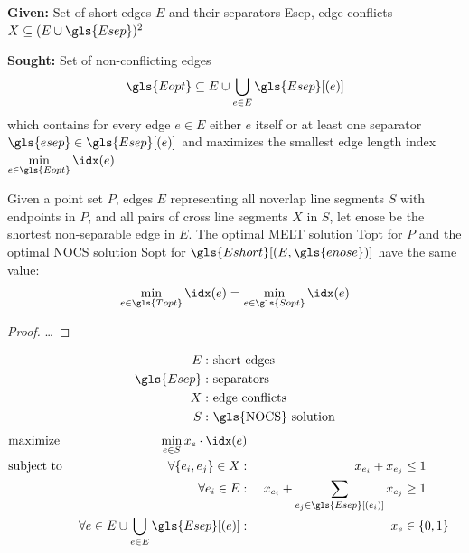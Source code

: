 \begin{problem}
  \hfill
  \begin{labeling}{\hspace{4em}}
    \item[\textbf{Given:}]
      Set of short edges \(E\) and their separators \gls{Esep},
      edge conflicts \(X \subseteq (E \cup \gls{Esep})^2\)
    \item[\textbf{Sought:}]
      Set of non-conflicting edges
      \[
        \gls{Eopt} \subseteq E
        \cup \bigcup\limits_{e \in E} \gls{Esep}[(e)]
      \]
      which contains for every edge \(e \in E\) either \(e\) itself
      or at least one separator \(\gls{esep} \in \gls{Esep}[(e)]\)
      and maximizes the smallest edge length index
      \(\min\limits_{e \in \gls{Eopt}} \idx(e)\)
  \end{labeling}
\end{problem}


\begin{theorem}
  Given a point set \(P\), edges \(E\) representing all
  \gls{noverlap} line segments \(S\) with endpoints in \(P\), and
  all pairs of \gls{cross} line segments \(X\) in \(S\), let
  \gls{enose} be the shortest non-separable edge in \(E\).
  The optimal \gls{MELT} solution \gls{Topt} for \(P\) 
  and the optimal \gls{NOCS} solution \gls{Sopt} for
  \(\gls{Eshort}[(E,\gls{enose})]\) have the same value:
  \[
    \min\limits_{e \in \gls{Topt}} \idx(e)
    = \min\limits_{e \in \gls{Sopt}} \idx(e)
  \]
\end{theorem}

\begin{proof}
  \ldots{}
\end{proof}


\begin{problem}
  \hfill
  \begin{alignat*}{1}
    E: &~ \text{short edges} \\
    \gls{Esep}: &~ \text{separators} \\
    X: &~ \text{edge conflicts} \\
    S: &~ \text{\gls{NOCS} solution}
  \end{alignat*}
  \begin{alignat*}{3}
    &\text{maximize } & \min\limits_{e \in S} x_e \cdot \idx(e) \\
    &\text{subject to } & \forall \{e_i,e_j\} \in X : &~& x_{e_i} + x_{e_j} &\leq 1 \\
    && \forall e_i \in E : &~
      & x_{e_i} + \sum\limits_{e_j \in \gls{Esep}[(e_i)]} x_{e_j} &\geq 1 \\
    && \forall e \in E
      \cup \bigcup\limits_{e \in E} \gls{Esep}[(e)] :
      &~& x_e &\in \{0,1\}
  \end{alignat*}
\end{problem}

